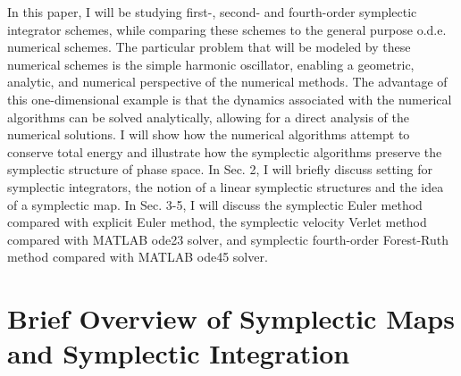 \documentclass[12pt]{article}
\begin{document}
\indent In this paper, I will be studying first-, second- and fourth-order symplectic integrator schemes, while comparing these schemes to the general purpose o.d.e. numerical schemes. The particular problem that will be modeled by these numerical schemes is the simple harmonic oscillator, enabling a geometric, analytic, and numerical perspective of the numerical methods. The advantage of this one-dimensional example is that the dynamics associated
with the numerical algorithms can be solved analytically, allowing for a direct analysis of the numerical solutions. I will show how the numerical algorithms attempt to conserve total energy and illustrate how the symplectic algorithms preserve the symplectic structure of phase space. In Sec. 2, I will briefly discuss setting for symplectic integrators, the notion of a linear symplectic structures and the idea of a symplectic map. In Sec. 3-5, I will discuss the symplectic Euler method compared with explicit Euler method, the symplectic velocity Verlet method compared with MATLAB ode23 solver, and symplectic fourth-order Forest-Ruth method compared with MATLAB ode45 solver.

\section{Brief Overview of Symplectic Maps and Symplectic Integration}
\end{document}
